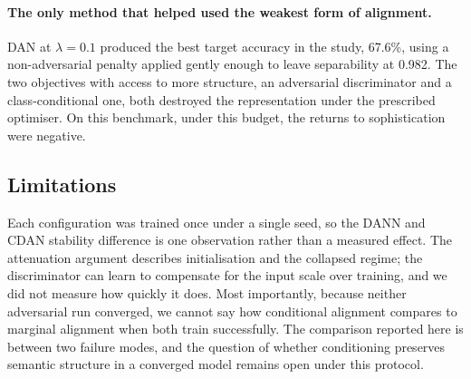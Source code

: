 \paragraph{The only method that helped used the weakest form of alignment.}
DAN at $\lambda = 0.1$ produced the best target accuracy in the study, 67.6\%,
using a non-adversarial penalty applied gently enough to leave separability at
0.982. The two objectives with access to more structure, an adversarial
discriminator and a class-conditional one, both destroyed the representation under
the prescribed optimiser. On this benchmark, under this budget, the returns to
sophistication were negative.

\subsection{Limitations}

Each configuration was trained once under a single seed, so the DANN and CDAN
stability difference is one observation rather than a measured effect. The
attenuation argument describes initialisation and the collapsed regime; the
discriminator can learn to compensate for the input scale over training, and we
did not measure how quickly it does. Most importantly, because neither adversarial
run converged, we cannot say how conditional alignment compares to marginal
alignment when both train successfully. The comparison reported here is between
two failure modes, and the question of whether conditioning preserves semantic
structure in a converged model remains open under this protocol.
